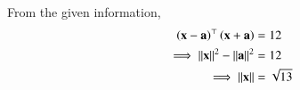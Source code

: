 From the given information,
\begin{align}
  \label{eq:12/10/3/9det2f}
  \left(\mathbf{x}-\mathbf{a}\right)^\top\left(\mathbf{x}+\mathbf{a}\right) &= 12 \\
  \implies \left\lVert\mathbf{x}\right\rVert^{2} - \left\lVert\mathbf{a}\right\rVert^{2} &= 12 \\
\implies   
	\left\lVert\mathbf{x}\right\rVert &= \sqrt{13}
\end{align}
